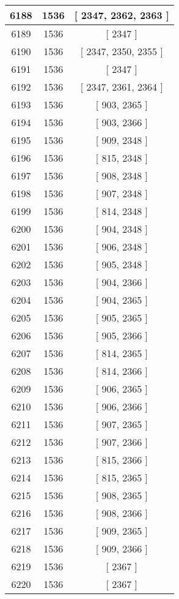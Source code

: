 \begin{center}
\begin{longtable}[H]{|| c c c ||}
\hline
6188 & 1536 & [ 2347, 2362, 2363 ] \\ 
\hline
6189 & 1536 & [ 2347 ] \\ 
\hline
6190 & 1536 & [ 2347, 2350, 2355 ] \\ 
\hline
6191 & 1536 & [ 2347 ] \\ 
\hline
6192 & 1536 & [ 2347, 2361, 2364 ] \\ 
\hline
6193 & 1536 & [ 903, 2365 ] \\ 
\hline
6194 & 1536 & [ 903, 2366 ] \\ 
\hline
6195 & 1536 & [ 909, 2348 ] \\ 
\hline
6196 & 1536 & [ 815, 2348 ] \\ 
\hline
6197 & 1536 & [ 908, 2348 ] \\ 
\hline
6198 & 1536 & [ 907, 2348 ] \\ 
\hline
6199 & 1536 & [ 814, 2348 ] \\ 
\hline
6200 & 1536 & [ 904, 2348 ] \\ 
\hline
6201 & 1536 & [ 906, 2348 ] \\ 
\hline
6202 & 1536 & [ 905, 2348 ] \\ 
\hline
6203 & 1536 & [ 904, 2366 ] \\ 
\hline
6204 & 1536 & [ 904, 2365 ] \\ 
\hline
6205 & 1536 & [ 905, 2365 ] \\ 
\hline
6206 & 1536 & [ 905, 2366 ] \\ 
\hline
6207 & 1536 & [ 814, 2365 ] \\ 
\hline
6208 & 1536 & [ 814, 2366 ] \\ 
\hline
6209 & 1536 & [ 906, 2365 ] \\ 
\hline
6210 & 1536 & [ 906, 2366 ] \\ 
\hline
6211 & 1536 & [ 907, 2365 ] \\ 
\hline
6212 & 1536 & [ 907, 2366 ] \\ 
\hline
6213 & 1536 & [ 815, 2366 ] \\ 
\hline
6214 & 1536 & [ 815, 2365 ] \\ 
\hline
6215 & 1536 & [ 908, 2365 ] \\ 
\hline
6216 & 1536 & [ 908, 2366 ] \\ 
\hline
6217 & 1536 & [ 909, 2365 ] \\ 
\hline
6218 & 1536 & [ 909, 2366 ] \\ 
\hline
6219 & 1536 & [ 2367 ] \\ 
\hline
6220 & 1536 & [ 2367 ] \\ 

\end{longtable}
\end{center}
